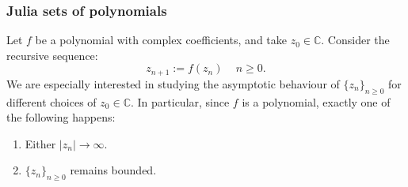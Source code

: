 \documentclass{beamer} %
\theoremstyle{definition} %
\newcommand{\Cplx}{\mathbb{C}}
\begin{document}
\begin{frame}\frametitle{Julia sets of polynomials}
    Let $f$ be a polynomial with complex coefficients, and take
    $z_0 \in \Cplx$. Consider the recursive sequence:
    \begin{equation*}
        z_{n+1} := f(z_n)\,\quad n\geq 0.
    \end{equation*}
    We are especially interested in studying the asymptotic behaviour of $\{z_n\}_{n\geq 0}$
    for different choices of $z_0 \in \Cplx$. In particular, since $f$ is a polynomial, exactly one of the following happens:
    \begin{enumerate}
        \item{} Either $|z_n| \to\infty$.
        \item{} $\{z_n\}_{n\geq 0}$ remains bounded.
    \end{enumerate}
\end{frame}
% 
% 
% 
%     
%     
\end{document}
